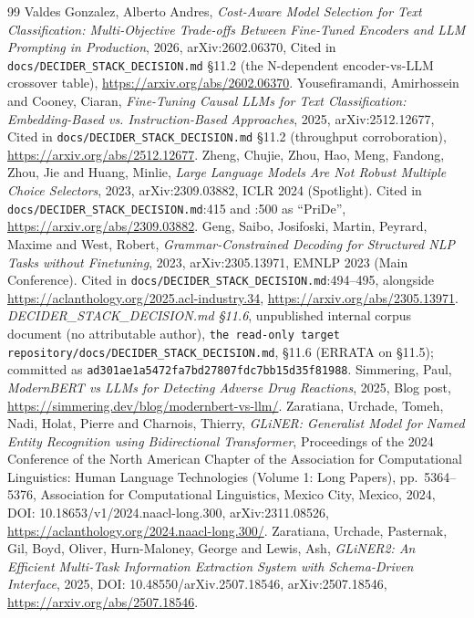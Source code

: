 \documentclass[11pt,a4paper]{article}
\begin{document}
\begin{thebibliography}{99}
 Valdes Gonzalez, Alberto Andres, \emph{Cost-Aware Model Selection for Text Classification: Multi-Objective Trade-offs Between Fine-Tuned Encoders and {LLM} Prompting in Production}, 2026, arXiv:2602.06370, Cited in \texttt{docs/DECIDER\_STACK\_DECISION.md} \S11.2 (the N-dependent encoder-vs-LLM crossover table), \url{https://arxiv.org/abs/2602.06370}.
 Yousefiramandi, Amirhossein and Cooney, Ciaran, \emph{Fine-Tuning Causal {LLM}s for Text Classification: Embedding-Based vs. Instruction-Based Approaches}, 2025, arXiv:2512.12677, Cited in \texttt{docs/DECIDER\_STACK\_DECISION.md} \S11.2 (throughput corroboration), \url{https://arxiv.org/abs/2512.12677}.
 Zheng, Chujie, Zhou, Hao, Meng, Fandong, Zhou, Jie and Huang, Minlie, \emph{Large Language Models Are Not Robust Multiple Choice Selectors}, 2023, arXiv:2309.03882, ICLR 2024 (Spotlight). Cited in \texttt{docs/DECIDER\_STACK\_DECISION.md}:415 and :500 as ``PriDe'', \url{https://arxiv.org/abs/2309.03882}.
 Geng, Saibo, Josifoski, Martin, Peyrard, Maxime and West, Robert, \emph{Grammar-Constrained Decoding for Structured {NLP} Tasks without Finetuning}, 2023, arXiv:2305.13971, EMNLP 2023 (Main Conference). Cited in \texttt{docs/DECIDER\_STACK\_DECISION.md}:494--495, alongside \url{https://aclanthology.org/2025.acl-industry.34}, \url{https://arxiv.org/abs/2305.13971}.
 \emph{{DECIDER\_STACK\_DECISION.md} \S11.6}, unpublished internal corpus document (no attributable author), \texttt{the read-only target repository/docs/DECIDER\_STACK\_DECISION.md}, \S11.6 (ERRATA on \S11.5); committed as \texttt{ad301ae1a5472fa7bd27807fdc7bb15d35f81988}.
 Simmering, Paul, \emph{{ModernBERT} vs {LLMs} for Detecting Adverse Drug Reactions}, 2025, Blog post, \url{https://simmering.dev/blog/modernbert-vs-llm/}.
 Zaratiana, Urchade, Tomeh, Nadi, Holat, Pierre and Charnois, Thierry, \emph{{GLiNER}: Generalist Model for Named Entity Recognition using Bidirectional Transformer}, Proceedings of the 2024 Conference of the North American Chapter of the Association for Computational Linguistics: Human Language Technologies (Volume 1: Long Papers), pp.~5364--5376, Association for Computational Linguistics, Mexico City, Mexico, 2024, DOI: 10.18653/v1/2024.naacl-long.300, arXiv:2311.08526, \url{https://aclanthology.org/2024.naacl-long.300/}.
 Zaratiana, Urchade, Pasternak, Gil, Boyd, Oliver, Hurn-Maloney, George and Lewis, Ash, \emph{{GLiNER2}: An Efficient Multi-Task Information Extraction System with Schema-Driven Interface}, 2025, DOI: 10.48550/arXiv.2507.18546, arXiv:2507.18546, \url{https://arxiv.org/abs/2507.18546}.

\end{thebibliography}
\end{document}
